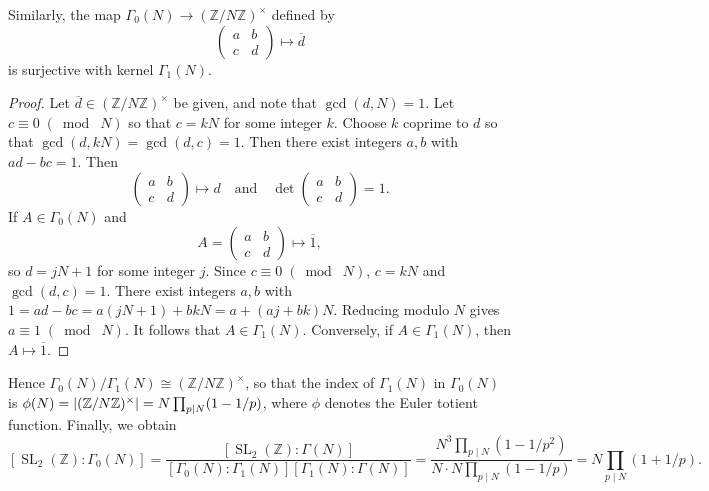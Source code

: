 \documentclass[10pt,leqno]{article}
\DeclareMathOperator{\SL}{SL}
\newcommand{\smod}[1]{\;(\bmod\; #1)}
\begin{document}
Similarly, the map $\varGamma_0(N)\to (\mathbb{Z}/N\mathbb{Z})^\times$ defined by \[\begin{pmatrix}
    a & b \\ c & d
\end{pmatrix}\mapsto \overline d\] 
is surjective with kernel $\varGamma_1(N)$.
\begin{proof}
    Let $\overline d \in (\mathbb{Z}/N\mathbb{Z})^\times$ be given, and note that $\gcd(d,N)=1$. Let $c \equiv 0\smod N$ so that $c=kN$ for some integer $k$. Choose $k$ coprime to $d$ so that $\gcd(d,kN) = \gcd(d,c) = 1$. Then there exist integers $a,b$ with $ad-bc = 1$. Then \[\begin{pmatrix}
        a & b \\ c & d
    \end{pmatrix}\mapsto d\quad\text{and}\quad \det\begin{pmatrix}
        a & b \\ c & d
    \end{pmatrix} = 1.\] 
    If $A\in \varGamma_0(N)$ and \[A = \begin{pmatrix}
        a & b \\ c & d
    \end{pmatrix}\mapsto \overline 1,\] so $d = jN+1$ for some integer $j$. Since $c\equiv 0\smod N$, $c= kN$ and $\gcd(d,c) = 1$. There exist integers $a,b$ with $1 = ad-bc = a(jN+1) + bkN = a+ (aj + bk)N$. Reducing modulo $N$ gives $a\equiv 1\smod N$. It follows that $A\in \varGamma_1(N)$. Conversely, if $A\in \varGamma_1(N)$, then $A\mapsto \overline 1$.
\end{proof}
Hence $\varGamma_0(N)/\varGamma_1(N)\cong (\mathbb{Z}/N\mathbb{Z})^\times$, so that the index of $\varGamma_1(N)$ in $\varGamma_0(N)$ is $\phi(N) = \abs{(\mathbb{Z}/N\mathbb{Z})^\times} = N\prod_{p\mid N}(1-1/p)$, where $\phi$ denotes the Euler totient function. Finally, we obtain \[[\SL_2(\mathbb{Z}) : \varGamma_0(N)] = \frac{[\SL_2(\mathbb{Z}) : \varGamma(N)]}{[\varGamma_0(N) : \varGamma_1(N)][\varGamma_1(N) : \varGamma(N)]} = \frac{N^3\prod_{p\mid N}(1-1/p^2)}{N\cdot N\prod_{p\mid N}(1-1/p)} = N\prod_{p\mid N}(1+1/p).\]
\end{document}

